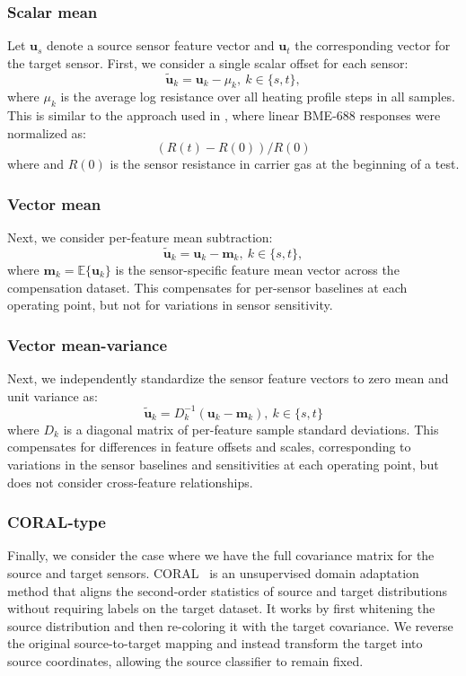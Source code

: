 \documentclass[conference]{IEEEtran}
\begin{document}
\subsubsection{Scalar mean}
Let $\mathbf{u}_s$ denote a source sensor feature vector and $\mathbf{u}_t$ the corresponding vector for the target sensor.
First, we consider a single scalar offset for each sensor:
\begin{equation}
\tilde{\mathbf{u}}_k=\mathbf{u}_k-\mu_k,\ k\in\{s, t\},
\end{equation}
where $\mu_k$ is the average log resistance over all heating profile steps in all samples. This is similar to the approach used in \cite{panzardi2025bme688}, where linear BME-688 responses were normalized as:
\begin{equation} 
    (R(t) - R(0))/R(0)
\end{equation} 
where and $R(0)$ is the sensor resistance in carrier gas at the beginning of a test.

\subsubsection{Vector mean}
Next, we consider per-feature mean subtraction:
\begin{equation}
\tilde{\mathbf{u}}_k=\mathbf{u}_k-\mathbf{m}_k,\ k\in\{s, t\},
\end{equation}
where $\mathbf{m}_k = \mathbb{E}\{\mathbf{u}_k\}$ is the sensor-specific feature mean vector across the compensation dataset.
This compensates for per-sensor baselines at each operating point, but not for variations in sensor sensitivity.

\subsubsection{Vector mean-variance}
Next, we independently standardize the sensor feature vectors to zero mean and unit variance as:
\begin{equation}
\tilde{\mathbf{u}}_k=D_k^{-1}(\mathbf{u}_k-\mathbf{m}_k),\ k\in\{s, t\}
\end{equation}
where $D_k$ is a diagonal matrix of per-feature sample standard deviations. This compensates for differences in feature offsets and scales, corresponding to variations in the sensor baselines and sensitivities at each operating point, but does not consider cross-feature relationships.

\subsubsection{CORAL-type}
Finally, we consider the case where we have the full covariance matrix for the source and target sensors.
CORAL~\cite{sun2016coral} is an unsupervised domain adaptation method that aligns the second-order statistics of source and target distributions without requiring labels on the target dataset. It works by first whitening the source distribution and then re-coloring it with the target covariance. We reverse the original source-to-target mapping and instead transform the target into source coordinates, allowing the source classifier to remain fixed.
\end{document}
